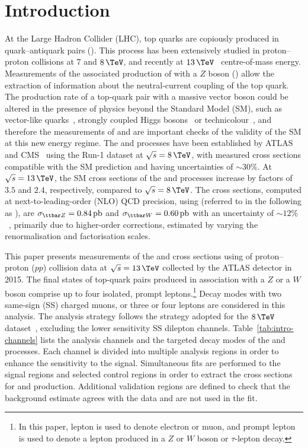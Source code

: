 \section{Introduction}
\label{s:intro}

At the Large Hadron Collider (LHC), top quarks are copiously produced in
quark--antiquark pairs (\ttbar). This process has been extensively studied in proton--proton collisions at 
$7$ and $8\,\TeV$, and recently at $13\,\TeV$~\cite{TOPQ-2015-09, CMS-TOP-15-003}
centre-of-mass energy.  Measurements of the associated production of \ttbar
with a $Z$ boson (\ttZ) allow the extraction of information about the neutral-current coupling of the top quark.  The production rate of a top-quark pair with a
massive vector boson could be altered in the presence of physics beyond the
Standard Model (SM), such as vector-like quarks~\cite{AguilarSaavedra:2009es,Aguilar-Saavedra:2013qpa}, strongly coupled Higgs bosons~\cite{Perelstein:2005ka} 
or technicolour~\cite{Chivukula:1992ap, Chivukula:1994mn, Hagiwara:1995jx, Mahanta:1996ng, Mahanta:1996qe},
and therefore the measurements of \sttZ and \sttW are important
checks of the validity of the SM at this new energy regime.  
The \ttZ and \ttW
processes have been established by ATLAS~\cite{TOPQ-2013-05} and
CMS~\cite{CMS-TOP-14-021} using the Run-1 dataset at $\sqrt{s} = 8\,\TeV$, with
measured cross sections compatible with the SM prediction and having uncertainties of
$\sim\!\!30\%$.  At $\sqrt{s} = 13\,\TeV$, the SM cross sections of the \ttZ and
\ttW processes increase by factors of $3.5$ and $2.4$, respectively, compared
to $\sqrt{s} = 8\,\TeV$. The cross sections, computed at next-to-leading-order
(NLO) QCD precision, using \MGMCatNLO (referred to in the
following as \MGAMC), are $\sttZ = 0.84\,\text{pb}$ and $\sttW =
0.60\,\text{pb}$ with an uncertainty of $\sim\!\!12\%$~\cite{Frixione:2015zaa, Alwall:2014hca}, primarily due to higher-order
corrections, estimated by varying the renormalisation and
factorisation scales.

This paper presents measurements of the \ttZ and \ttW cross sections using
\lumi of proton--proton ($pp$) collision data at $\sqrt{s} = 13\,\TeV$
collected by the ATLAS detector in 2015.  The final states of top-quark pairs
produced in association with a $Z$ or a $W$ boson comprise up to four isolated,
prompt leptons.\footnote{In this paper, lepton is used to denote electron or
muon, and prompt lepton is used to denote a lepton produced in a $Z$ or $W$
boson or $\tau$-lepton decay.}  Decay modes with two same-sign (SS) charged
muons, or three or four leptons are considered in this analysis.  The analysis
strategy follows the strategy adopted for the $8\,\TeV$
dataset~\cite{TOPQ-2013-05}, excluding the lower sensitivity SS dilepton
channels.  Table~\ref{tab:intro-channels} lists the analysis channels and the
targeted decay modes of the \ttZ and \ttW processes.  Each channel is divided
into multiple analysis regions in order to enhance the sensitivity to the
signal.  Simultaneous fits are performed to the signal regions and selected
control regions in order to extract the cross sections for \ttZ and \ttW
production.  Additional validation regions are defined to check that the
background estimate agrees with the data and are not used in the fit.

